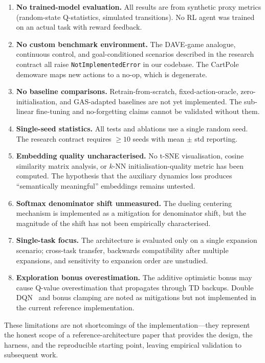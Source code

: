 \documentclass{article}
\begin{document}
\begin{enumerate}
  \item \textbf{No trained-model evaluation.} All results are from synthetic proxy metrics (random-state Q-statistics, simulated transitions). No RL agent was trained on an actual task with reward feedback.
  \item \textbf{No custom benchmark environment.} The DAVE-game analogue, continuous control, and goal-conditioned scenarios described in the research contract all raise \texttt{NotImplementedError} in our codebase. The CartPole demoware maps new actions to a no-op, which is degenerate.
  \item \textbf{No baseline comparisons.} Retrain-from-scratch, fixed-action-oracle, zero-initialisation, and GAS-adapted baselines are not yet implemented. The sub-linear fine-tuning and no-forgetting claims cannot be validated without them.
  \item \textbf{Single-seed statistics.} All tests and ablations use a single random seed. The research contract requires $\geq\!10$ seeds with mean $\pm$ std reporting.
  \item \textbf{Embedding quality uncharacterised.} No t-SNE visualisation, cosine similarity matrix analysis, or $k$-NN initialisation-quality metric has been computed. The hypothesis that the auxiliary dynamics loss produces ``semantically meaningful'' embeddings remains untested.
  \item \textbf{Softmax denominator shift unmeasured.} The dueling centering mechanism is implemented as a mitigation for denominator shift, but the magnitude of the shift has not been empirically characterised.
  \item \textbf{Single-task focus.} The architecture is evaluated only on a single expansion scenario; cross-task transfer, backwards compatibility after multiple expansions, and sensitivity to expansion order are unstudied.
  \item \textbf{Exploration bonus overestimation.} The additive optimistic bonus may cause Q-value overestimation that propagates through TD backups. Double DQN~\cite{vanhasselt2016double} and bonus clamping are noted as mitigations but not implemented in the current reference implementation.
\end{enumerate}

These limitations are not shortcomings of the implementation---they represent the honest scope of a reference-architecture paper that provides the design, the harness, and the reproducible starting point, leaving empirical validation to subsequent work.
\end{document}
